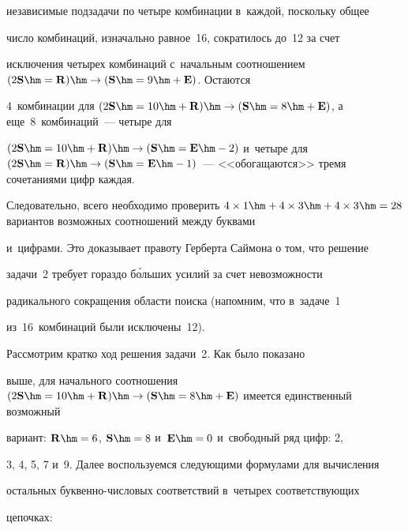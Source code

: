 независимые подзадачи по четыре комбинации в~каждой, поскольку общее 


число комбинаций, изначально равное~16, сократилось до~12 за счет 


исключения четырех комбинаций с~начальным соотношением $(2\mathbf{S}\hm 


= \mathbf{R})\hm\to  (\mathbf{S}\hm = 9 \hm+ \mathbf{E})$. Остаются 


4~комбинации для $(2\mathbf{S}\hm = 10 \hm+ \mathbf{R}) \hm\to 


(\mathbf{S}\hm = 8 \hm+ \mathbf{E})$, а еще~8~комбинаций~--- четыре для 


$(2\mathbf{S}\hm = 10 \hm+ \mathbf{R})\hm\to (\mathbf{S}\hm = \mathbf{E}\hm- 


2)$ и~четыре для $(2\mathbf{S}\hm = \mathbf{R}) \hm\to (\mathbf{S}\hm = 


\mathbf{E}\hm- 1)$~--- <<обогащаются>> тремя сочетаниями цифр каждая. 


Следовательно, всего необходимо проверить $4\times1 \hm+ 4\times3 \hm+ 


4\times3 \hm= 28$ вариантов возможных соотношений между буквами 


и~цифрами. Это доказывает правоту Герберта Саймона о том, что решение 


задачи~2 требует гораздо б\'{о}льших усилий за счет невозможности 


радикального сокращения области поиска (напомним, что в~задаче~1 


из~16~комбинаций были исключены~12). 


    


    {Рассмотрим кратко ход решения задачи~2.} Как было показано 


выше, для начального соотношения $(2\mathbf{S}\hm = 10 \hm+ \mathbf{R}) 


\hm\to  (\mathbf{S}\hm = 8 \hm+ \mathbf{E})$ имеется единственный возможный 


вариант: $\mathbf{R} \hm= 6$, $\mathbf{S} \hm= 8$ и~$\mathbf{E}\hm= 0$ и~свободный ряд цифр: 2, 


3, 4, 5, 7 и~9. Далее воспользуемся следующими формулами для вычисления 


остальных бук\-вен\-но-чис\-ло\-вых соответствий в~четырех соответствующих 


цепочках: 


